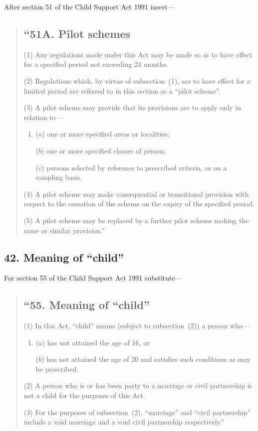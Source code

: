 \documentclass[12pt,a4paper]{article}
\begin{document}
After section 51 of the Child Support Act 1991 insert---

\begin{quotation}
\subsection*{``51A. Pilot schemes}

(1) Any regulations made under this Act may be made so as to have effect for a specified period not exceeding 24 months.

(2)
Regulations which, by virtue of subsection~(1), are to have effect for a limited period are referred to in this section as a “pilot scheme”.

(3) A pilot scheme may provide that its provisions are to apply only in relation to---
\begin{enumerate}\item[]
($a$) one or more specified areas or localities;

($b$) one or more specified classes of person;

($c$) persons selected by reference to prescribed criteria, or on a sampling basis.
\end{enumerate}

(4)
A pilot scheme may make consequential or transitional provision with respect to the cessation of the scheme on the expiry of the specified period.

(5)
A pilot scheme may be replaced by a further pilot scheme making the same or similar provision.''
\end{quotation}

\subsection{42. Meaning of ``child''}

For section 55 of the Child Support Act 1991 substitute---

\begin{quotation}
\subsection*{``55. Meaning of ``child''}

(1) In this Act, “child” means (subject to subsection~(2)) a person who---
\begin{enumerate}\item[]
($a$) has not attained the age of 16, or

($b$) has not attained the age of 20 and satisfies such conditions as may be prescribed.
\end{enumerate}

(2)
A person who is or has been party to a marriage or civil partnership is not a child for the purposes of this Act.

(3)
For the purposes of subsection~(2), “marriage” and “civil partnership” include a void marriage and a void civil partnership respectively.''
\end{quotation}
\end{document}
